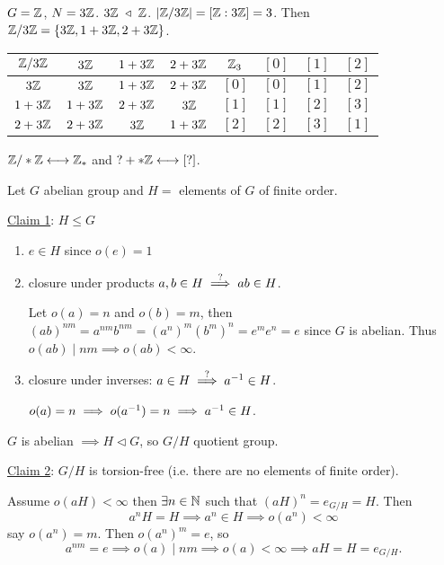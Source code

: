\documentclass[]{article}
\begin{document}
\begin{example}
	$G = \mathbb{Z}$, $N = 3\mathbb{Z}$. $3\mathbb{Z}\ \triangleleft\ \mathbb{Z}$. $|\mathbb{Z}/3\mathbb{Z}| = [\mathbb{Z}:3\mathbb{Z}] = 3$. Then $\mathbb{Z}/3\mathbb{Z} = \left\{ 3\mathbb{Z}, 1+3\mathbb{Z},2+3\mathbb{Z} \right\}$.
	\begin{center}
	\begin{tabular}{c|ccc||c|ccc}
		$\mathbb{Z}/3\mathbb{Z}$ & $3\mathbb{Z}$ & $1+3\mathbb{Z}$ & $2+3\mathbb{Z}$ & $\mathbb{Z}_3$ & $[0]$ & $[1]$ & $[2]$ \\
	\hline 
	$3\mathbb{Z}$ & $3\mathbb{Z}$ & $1+3\mathbb{Z}$ & $2+3\mathbb{Z}$ & $[0]$ & $[0]$ & $[1]$ & $[2]$ \\
	$1+3\mathbb{Z}$ & $1+3\mathbb{Z}$ & $2+3\mathbb{Z}$ & $3\mathbb{Z}$ & $[1]$ & $[1]$ & $[2]$ & $[3]$ \\
	$2+3\mathbb{Z}$ & $2+3\mathbb{Z}$ & $3\mathbb{Z}$ & $1+3\mathbb{Z}$ & $[2]$ & $[2]$ & $[3]$ & $[1]$
	\end{tabular} 
	\end{center}
	$\mathbb{Z}/*\mathbb{Z} \longleftrightarrow \mathbb{Z}_*$ and $? + *\mathbb{Z} \longleftrightarrow [?]$.
\end{example}

\begin{example}
	Let $G$ abelian group and $H = $ elements of $G$ of finite order.

	\ul{Claim 1}: $H\leq G$
	\begin{enumerate}
		\item $e\in H$ since $o(e) = 1$
		\item closure under products $a,b\in H \overset{?}{\implies} ab\in H$.

			Let $o(a) = n$ and $o(b) = m$, then $(ab)^{nm} = a^{nm}b^{nm} = (a^n)^m (b^m)^n = e^m e^n = e$ since $G$ is abelian. Thus $o(ab) \mid nm \implies o(ab) < \infty$.

		\item closure under inverses: $a\in H \overset{?}{\implies} a^{-1}\in H$.

			$o(a) = n \implies o(a^{-1}) = n \implies a^{-1}\in H$.
	\end{enumerate}
	$G$ is abelian $\implies H\triangleleft G$, so $G/H$ quotient group.

	\ul{Claim 2}: $G/H$ is torsion-free (i.e. there are no elements of finite order).

	Assume $o(aH)<\infty$ then $\exists n\in\mathbb{N}$ such that $(aH)^n = e_{G/H} = H$. 
	Then $$a^n H = H \implies a^n\in H \implies o(a^n)<\infty$$ say $o(a^n) = m$.
	Then $o(a^n)^m = e$, so $$a^{nm} = e \implies o(a)\mid nm \implies o(a) < \infty \implies aH = H = e_{G/H}.$$
\end{example}
\end{document}

